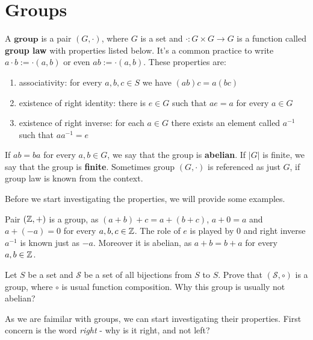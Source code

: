 \chapter{Groups}
\label{groups}
\begin{definition}
  A $\textbf{group}$ is a pair $(G, \cdot)$, where $G$ is a set and $\cdot: G\times G\to G$ is a function called \textbf{group law} with properties listed below. It's a common practice to write $a\cdot b := \cdot(a,b)$ or even $ab := \cdot(a,b)$. These properties are:
  \begin{enumerate}
    \item associativity: for every $a,b,c\in S$ we have $(ab)c=a(bc)$
    \item existence of right identity: there is $e\in G$ such that $ae=a$ for every $a\in G$
    \item existence of right inverse: for each $a\in G$ there exists an element called $a^{-1}$ such that $aa^{-1}=e$
  \end{enumerate}
  If $ab=ba$ for every $a,b\in G$, we say that the group is \textbf{abelian}. If $|G|$ is finite, we say that the group is \textbf{finite}.
  Sometimes group $(G, \cdot)$ is referenced as just $G$, if group law is known from the context.
\end{definition}

Before we start investigating the properties, we will provide some examples.

\begin{example}
  Pair $(\mathbb Z, +)$ is a group, as $(a+b)+c=a+(b+c)$, $a+0=a$ and $a+(-a)=0$ for every $a,b,c\in \mathbb Z$. The role of $e$ is played by 0 and right inverse $a^{-1}$ is known just as $-a$.
  Moreover it is abelian, as $a+b=b+a$ for every $a,b\in \mathbb Z$.
\end{example}

\begin{exercise}
  Let $S$ be a set and $\mathcal S$ be a set of all bijections from $S$ to $S$. Prove that $(\mathcal S, \circ)$ is a group, where $\circ$ is usual function composition. Why this group is usually not abelian?
\end{exercise}

As we are faimilar with groups, we can start investigating their properties. First concern is the word \emph{right} - why is it right, and not left?

